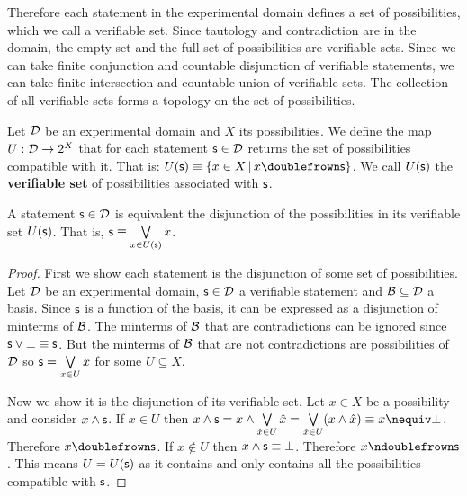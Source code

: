 \documentclass[11pt,letterpaper,fleqn]{memoir} %
\begin{document}
Therefore each statement in the experimental domain defines a set of possibilities, which we call a verifiable set. Since tautology and contradiction are in the domain, the empty set and the full set of possibilities are verifiable sets. Since we can take finite conjunction and countable disjunction of verifiable statements, we can take finite intersection and countable union of verifiable sets. The collection of all verifiable sets forms a topology on the set of possibilities.

\begin{mathSection}
	
\begin{defn}
	Let $\mathcal{D}$ be an experimental domain and $X$ its possibilities. We define the map $U : \mathcal{D} \rightarrow 2^X$ that for each statement $\mathsf{s} \in \mathcal{D}$ returns the set of possibilities compatible with it. That is: $U(\obs)\equiv\{ x \in X \, | \, x \comp \obs\}$. We call $U(\mathsf{s})$ the \textbf{verifiable set} of possibilities associated with $\mathsf{s}$.
\end{defn}

\begin{prop}
	A statement $\mathsf{s} \in \mathcal{D}$ is equivalent the disjunction of the possibilities in its verifiable set $U(\mathsf{s})$. That is, $\mathsf{s} \equiv \bigvee\limits_{x \in U(\mathsf{s})} x$.
\end{prop}
\begin{proof}
	First we show each statement is the disjunction of some set of possibilities. Let $\mathcal{D}$ be an experimental domain, $\mathsf{s} \in \mathcal{D}$ a verifiable statement and $\mathcal{B} \subseteq \mathcal{D}$ a basis. Since $\mathsf{s}$ is a function of the basis, it can be expressed as a disjunction of minterms of $\mathcal{B}$. The minterms of $\mathcal{B}$ that are contradictions can be ignored since $\mathsf{s} \vee \bot \equiv \mathsf{s}$. But the minterms of $\mathcal{B}$ that are not contradictions are possibilities of $\mathcal{D}$ so $\mathsf{s}=\bigvee\limits_{x \in U} x$ for some $U \subseteq X$.
	
	Now we show it is the disjunction of its verifiable set. Let $x \in X$ be a possibility and consider $x \wedge \mathsf{s}$. If $x\in U$ then $x \AND \obs = x \AND \bigOR\limits_{\hat{x} \in U} \hat{x} = \bigOR\limits_{\hat{x} \in U} ( x \AND \hat{x}) \equiv x \nequiv \contradiction$. Therefore $x \comp \obs$. If $x \notin U$ then $x \wedge \mathsf{s} \equiv \bot$. Therefore $x \ncomp \obs$. This means $U=U(\mathsf{s})$ as it contains and only contains all the possibilities compatible with $\mathsf{s}$.
\end{proof}


\end{mathSection}
\end{document}
